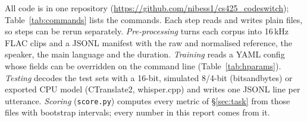 All code is in one repository (\url{https://github.com/nibess1/cs425_codeswitch}); Table~\ref{tab:commands} lists the commands. Each step reads and writes plain files, so steps can be rerun separately. \emph{Pre-processing} turns each corpus into 16\,kHz FLAC clips and a JSONL manifest with the raw and normalised reference, the speaker, the main language and the duration. \emph{Training} reads a YAML config whose fields can be overridden on the command line (Table~\ref{tab:hparams}). \emph{Testing} decodes the test sets with a 16-bit, simulated 8/4-bit (bitsandbytes) or exported CPU model (CTranslate2, whisper.cpp) and writes one JSONL line per utterance. \emph{Scoring} (\texttt{score.py}) computes every metric of \S\ref{sec:task} from those files with bootstrap intervals; every number in this report comes from it.
